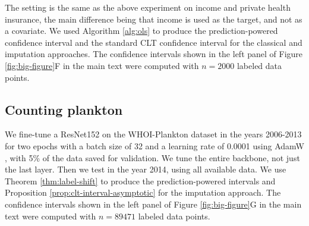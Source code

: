 \documentclass[10pt]{article}
\begin{document}
The setting is the same as the above experiment on income and private health insurance, the main difference being that income is used as the target, and not as a covariate.
We used Algorithm \ref{alg:ols} to produce the prediction-powered confidence interval and the standard CLT confidence interval for the classical and imputation approaches. The confidence intervals shown in the left panel of Figure \ref{fig:big-figure}F in the main text were computed with $n = 2000$ labeled data points.

\subsection{Counting plankton}

We fine-tune a ResNet152 \cite{he2016deep} on the WHOI-Plankton dataset \cite{orenstein2015whoi} in the years 2006-2013 for two epochs with a batch size of 32 and a learning rate of 0.0001 using AdamW \cite{loshchilov2017decoupled}, with 5\% of the data saved for validation.
We tune the entire backbone, not just the last layer.
Then we test in the year 2014, using all available data.
We use Theorem \ref{thm:label-shift} to produce the prediction-powered intervals and Proposition \ref{prop:clt-interval-asymptotic} for the imputation approach. The confidence intervals shown in the left panel of Figure \ref{fig:big-figure}G in the main text were computed with $n = 89471$ labeled data points.
\end{document}
